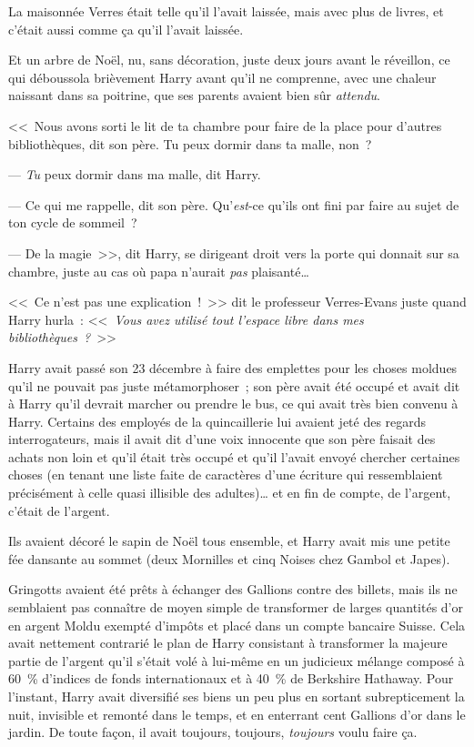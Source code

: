 La maisonnée Verres était telle qu'il l'avait laissée, mais avec plus de livres, et c'était aussi comme ça qu'il l'avait laissée.

Et un arbre de Noël, nu, sans décoration, juste deux jours avant le réveillon, ce qui déboussola brièvement Harry avant qu'il ne comprenne, avec une chaleur naissant dans sa poitrine, que ses parents avaient bien sûr \emph{attendu}.

<<~Nous avons sorti le lit de ta chambre pour faire de la place pour d'autres bibliothèques, dit son père. Tu peux dormir dans ta malle, non~?

--- \emph{Tu} peux dormir dans ma malle, dit Harry.

--- Ce qui me rappelle, dit son père. Qu'\emph{est}-ce qu'ils ont fini par faire au sujet de ton cycle de sommeil~?

--- De la magie~>>, dit Harry, se dirigeant droit vers la porte qui donnait sur sa chambre, juste au cas où papa n'aurait \emph{pas} plaisanté…

<<~Ce n'est pas une explication~!~>> dit le professeur Verres-Evans juste quand Harry hurla~: <<~\emph{Vous avez utilisé tout l'espace libre dans mes bibliothèques~?}~>>

\later

Harry avait passé son 23 décembre à faire des emplettes pour les choses moldues qu'il ne pouvait pas juste métamorphoser~; son père avait été occupé et avait dit à Harry qu'il devrait marcher ou prendre le bus, ce qui avait très bien convenu à Harry. Certains des employés de la quincaillerie lui avaient jeté des regards interrogateurs, mais il avait dit d'une voix innocente que son père faisait des achats non loin et qu'il était très occupé et qu'il l'avait envoyé chercher certaines choses (en tenant une liste faite de caractères d'une écriture qui ressemblaient précisément à celle quasi illisible des adultes)… et en fin de compte, de l'argent, c'était de l'argent.

Ils avaient décoré le sapin de Noël tous ensemble, et Harry avait mis une petite fée dansante au sommet (deux Mornilles et cinq Noises chez Gambol et Japes).

Gringotts avaient été prêts à échanger des Gallions contre des billets, mais ils ne semblaient pas connaître de moyen simple de transformer de larges quantités d'or en argent Moldu exempté d'impôts et placé dans un compte bancaire Suisse. Cela avait nettement contrarié le plan de Harry consistant à transformer la majeure partie de l'argent qu'il s'était volé à lui-même en un judicieux mélange composé à 60~\% d'indices de fonds internationaux et à 40~\% de Berkshire Hathaway. Pour l'instant, Harry avait diversifié ses biens un peu plus en sortant subrepticement la nuit, invisible et remonté dans le temps, et en enterrant cent Gallions d'or dans le jardin. De toute façon, il avait toujours, toujours, \emph{toujours} voulu faire ça.

